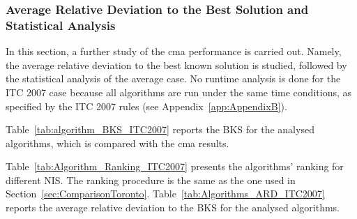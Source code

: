 \subsubsection{Average Relative Deviation to the Best Solution and Statistical Analysis}

In this section, a further study of the \gls{cma} performance is carried out. Namely, the average relative deviation to the best known solution is studied, followed by the statistical analysis of the average case. No runtime analysis is done for the ITC 2007 case because all algorithms are run under the same time conditions, as specified by the ITC 2007 rules (see Appendix~\ref{app:AppendixB}).

Table~\ref{tab:algorithm_BKS_ITC2007} reports the BKS for the analysed algorithms, which is compared with the \gls{cma} results.

Table~\ref{tab:Algorithm_Ranking_ITC2007} presents the algorithms' ranking for different NIS. The ranking procedure is the same as the one used in Section~\ref{sec:ComparisonToronto}. Table~\ref{tab:Algorithms_ARD_ITC2007} reports the average relative deviation to the BKS for the analysed algorithms.






